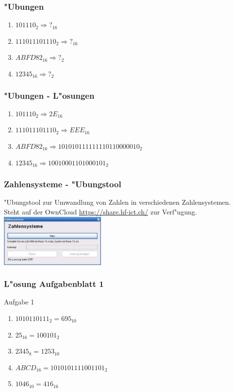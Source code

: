 \documentclass{beamer}
\begin{document}
\frame
{
	\frametitle{"Ubungen}
	\begin{enumerate}
	\item $101110_{2} \Rightarrow ?_{16}$
	\item $111011101110_{2} \Rightarrow ?_{16}$
	\item $ABFD82_{16} \Rightarrow ?_{2}$
	\item $12345_{16} \Rightarrow ?_{2}$
	\end{enumerate}
}

\frame
{
	\frametitle{"Ubungen - L"osungen}
	\begin{enumerate}
	\item $101110_{2} \Rightarrow 2E_{16}$
	\item $111011101110_{2} \Rightarrow EEE_{16}$
	\item $ABFD82_{16} \Rightarrow 101010111111110110000010_{2}$
	\item $12345_{16} \Rightarrow 10010001101000101_{2}$
	\end{enumerate}
}

\frame
{
	\frametitle{Zahlensysteme - "Ubungstool}
	"Ubungstool zur Umwandlung von Zahlen in verschiedenen Zahlensystemen. Steht auf der OwnCloud \href{url}{https://share.hf-ict.ch/} zur Verf"ugung.\\
	\includegraphics[width=150pt]{zahlensysteme.eps}
}

\frame
{
	\frametitle{L"osung Aufgabenblatt 1}
	Aufgabe 1
	\begin{enumerate}
	\item $1010110111_{2} = 695_{10}$
	\item $25_{16} = 100101_{2}$
	\item $2345_{8} = 1253_{10}$
	\item $ABCD_{16} = 1010101111001101_{2}$
	\item $1046_{10} = 416_{16}$
	\end{enumerate}
}
\end{document}
